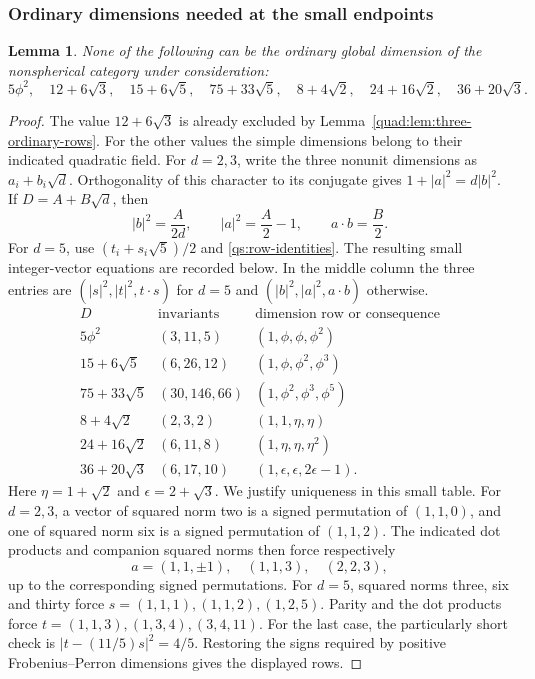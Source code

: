 \documentclass[11pt,a4paper]{article}
\newtheorem{lemma}[theorem]{Lemma}
\theoremstyle{definition}\newtheorem{definition}[theorem]{Definition}
\theoremstyle{remark}\newtheorem{remark}[theorem]{Remark}
\numberwithin{equation}{section}
\begin{document}
\subsubsection{Ordinary dimensions needed at the small endpoints}

\begin{lemma}\label{qs:ordinary-endpoints}
None of the following can be the ordinary global dimension of the
nonspherical category under consideration:
\[
 5\phi^2,\quad 12+6\sqrt3,\quad15+6\sqrt5,\quad
 75+33\sqrt5,\quad8+4\sqrt2,\quad24+16\sqrt2,\quad36+20\sqrt3.
\]
\end{lemma}
\begin{proof}
The value $12+6\sqrt3$ is already excluded by Lemma~\ref{quad:lem:three-ordinary-rows}.
For the other values the simple dimensions belong to their indicated quadratic field.
For $d=2,3$, write the three nonunit dimensions as $a_i+b_i\sqrt d$.
Orthogonality of this character to its conjugate gives
$1+|a|^2=d|b|^2$. If $D=A+B\sqrt d$, then
\[
 |b|^2=\frac A{2d},\qquad |a|^2=\frac A2-1,
 \qquad a\cdot b=\frac B2.
\]
For $d=5$, use $(t_i+s_i\sqrt5)/2$ and
\eqref{qs:row-identities}. The resulting small integer-vector equations
are recorded below. In the middle column the three entries are
$(|s|^2,|t|^2,t\cdot s)$ for $d=5$ and
$(|b|^2,|a|^2,a\cdot b)$ otherwise.
\[
\begin{array}{c|c|l}
D&\text{invariants}&\text{dimension row or consequence}\\\hline
5\phi^2&(3,11,5)&(1,\phi,\phi,\phi^2)\\
15+6\sqrt5&(6,26,12)&(1,\phi,\phi^2,\phi^3)\\
75+33\sqrt5&(30,146,66)&(1,\phi^2,\phi^3,\phi^5)\\
8+4\sqrt2&(2,3,2)&(1,1,\eta,\eta)\\
24+16\sqrt2&(6,11,8)&(1,\eta,\eta,\eta^2)\\
36+20\sqrt3&(6,17,10)&(1,\epsilon,\epsilon,2\epsilon-1).
\end{array}
\]
Here $\eta=1+\sqrt2$ and $\epsilon=2+\sqrt3$.
We justify uniqueness in this small table. For $d=2,3$, a vector
of squared norm two is a signed permutation of $(1,1,0)$, and one
of squared norm six is a signed permutation of $(1,1,2)$.
The indicated dot products and companion squared norms then force
respectively
\[
 a=(1,1,\pm1),\quad(1,1,3),\quad(2,2,3),
\]
up to the corresponding signed permutations. For $d=5$, squared
norms three, six and thirty force $s=(1,1,1),(1,1,2),(1,2,5)$.
Parity and the dot products force $t=(1,1,3),(1,3,4),(3,4,11)$.
For the last case, the particularly short check is
$|t-(11/5)s|^2=4/5$. Restoring the signs required by positive
Frobenius--Perron dimensions gives the displayed rows.


\end{proof}
\end{document}
